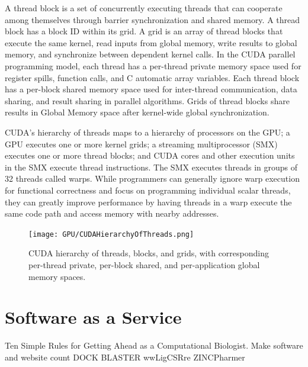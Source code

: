A thread block is a set of concurrently executing threads that can cooperate among themselves through barrier synchronization and shared memory. A thread block has a block ID within its grid. A grid is an array of thread blocks that execute the same kernel, read inputs from global memory, write results to global memory, and synchronize between dependent kernel calls. In the CUDA parallel programming model, each thread has a per-thread private memory space used for register spills, function calls, and C automatic array variables. Each thread block has a per-block shared memory space used for inter-thread communication, data sharing, and result sharing in parallel algorithms. Grids of thread blocks share results in Global Memory space after kernel-wide global synchronization.

CUDA's hierarchy of threads maps to a hierarchy of processors on the GPU; a GPU executes one or more kernel grids; a streaming multiprocessor (SMX) executes one or more thread blocks; and CUDA cores and other execution units in the SMX execute thread instructions. The SMX executes threads in groups of 32 threads called warps. While programmers can generally ignore warp execution for functional correctness and focus on programming individual scalar threads, they can greatly improve performance by having threads in a warp execute the same code path and access memory with nearby addresses.

\begin{figure}
\centering
\texttt{[image: GPU/CUDAHierarchyOfThreads.png]}
\caption{CUDA hierarchy of threads, blocks, and grids, with corresponding per-thread private, per-block shared, and per-application global memory spaces.}
\label{GPU:CUDAMemoryHierarchy}
\end{figure}

\section{Software as a Service}

Ten Simple Rules for Getting Ahead as a Computational Biologist. Make software and website count \citep{260}
DOCK BLASTER
wwLigCSRre
ZINCPharmer


\chapterend
